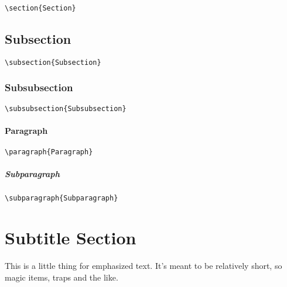 \begin{multicols}{2}
\verb+\section{Section}+

\lipsum[1]

\subsection{Subsection}

\verb+\subsection{Subsection}+

\lipsum[2]

\subsubsection{Subsubsection}

\verb+\subsubsection{Subsubsection}+

\lipsum[3]

\paragraph{Paragraph}

\verb+\paragraph{Paragraph}+

\lipsum[4]

\subparagraph{Subparagraph}

\verb+\subparagraph{Subparagraph}+
\lipsum[5]

\section{Subtitle Section}

This is a little thing for emphasized text.
It's meant to be relatively short, so magic items, traps and the like.


\end{multicols}

